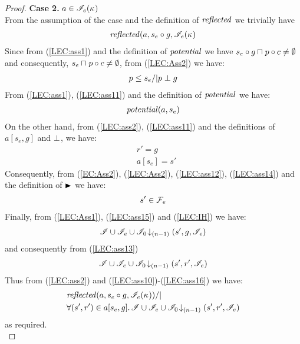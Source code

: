\begin{lemma}
\begin{proof}
\noindent\textbf{Case 2. }$a \in \mathscr{I}_e(\kappa_{})$\\
From the assumption of the case and the definition of $\mathit{reflected}$ we trivially have
%
\begin{align}
	\mathit{reflected}(a, s_e \circ g, \mathscr{I}_e(\kappa_{})
	\label{LEC:ass10}
\end{align}
%
Since from (\ref{LEC:ass1}) and the definition of $\mathit{potential}$ we have $s_e \circ g \sqcap_{} p \circ c \not= \emptyset$ and consequently, $s_e \sqcap_{} p \circ c \not= \emptyset$, from (\ref{LEC:Ass2}) we have:
%
\begin{align}
	p \leq s_e /| p \mathrel{\bot} g\label{LEC:ass11}
\end{align}
% 
From (\ref{LEC:ass1}), (\ref{LEC:ass11}) and the definition of $\mathit{potential}$ we have:
%
\begin{align}
	\mathit{potential}(a, s_e) \label{LEC:ass12}
\end{align}
%
On the other hand, from (\ref{LEC:ass2}), (\ref{LEC:ass11}) and the definitions of $a[s_e, g]$ and $\mathrel{\bot}$, we have: 
%
\begin{align}
	& r' = g \label{LEC:ass13}\\
	& a[s_e] = s' \label{LEC:ass14}
\end{align}
%
Consequently, from (\ref{EC:Ass2}), (\ref{LEC:Ass2}), (\ref{LEC:ass12}), (\ref{LEC:ass14}) and the definition of $\strictfences$ we have:
%
\begin{align}
	s' \in  \mathcal{F}_{e}  \label{LEC:ass15}
\end{align}
%
Finally, from (\ref{LEC:Ass1}), (\ref{LEC:ass15}) and (\ref{LEC:IH}) we have:
%
\begin{align*}
	\mathscr{I} \cup \mathscr{I}_{e} \cup \mathscr{I}_0 \!\downarrow_{(n-1)} \left(s', g, \mathscr{I}_e\right)
\end{align*}
%
and consequently from (\ref{LEC:ass13})
%
\begin{align}
	\mathscr{I} \cup \mathscr{I}_{e} \cup \mathscr{I}_0 \!\downarrow_{(n-1)} \left(s', r', \mathscr{I}_e\right)
	\label{LEC:ass16}
\end{align}
%
Thus from (\ref{LEC:ass2}) and (\ref{LEC:ass10})-(\ref{LEC:ass16}) we have:
%
\begin{align*}
	& \mathit{reflected}(a, s_e \circ g, \mathscr{I}_e(\kappa_{})) /| \\
	& \forall (s', r') \in a[s_e, g].\, \mathscr{I} \cup \mathscr{I}_e \cup \mathscr{I}_0 \!\downarrow_{(n-1)} \left(s', r', \mathscr{I}_e\right)
\end{align*}
%
as required.\\

\end{proof}
\end{lemma}
%
%
%
%
%
%
%
%
%
%
%

